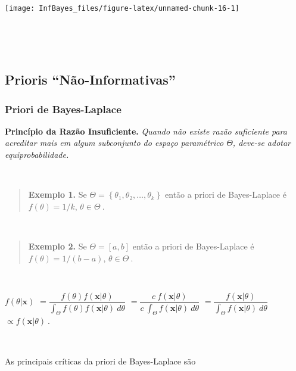 \documentclass[
]{book}
\begin{document}
\begin{center}\texttt{[image: InfBayes\_files/figure-latex/unnamed-chunk-16-1]} \end{center}

\(~\)

\(~\)

\hypertarget{prioris-nuxe3o-informativas}{%
\subsection{Prioris ``Não-Informativas''}\label{prioris-nuxe3o-informativas}}

\hypertarget{priori-de-bayes-laplace}{%
\subsubsection{Priori de Bayes-Laplace}\label{priori-de-bayes-laplace}}

\textbf{Princípio da Razão Insuficiente.} \emph{Quando não existe razão suficiente para acreditar mais em algum subconjunto do espaço paramétrico \(\Theta\), deve-se adotar equiprobabilidade.}

\(~\)

\begin{quote}
\textbf{Exemplo 1.} Se \(\Theta=\left\{\theta_1,\theta_2,\ldots,\theta_k\right\}\) então a priori de Bayes-Laplace é \(f(\theta)=1/k\), \(\theta \in \Theta~.\)
\end{quote}

\(~\)

\begin{quote}
\textbf{Exemplo 2.} Se \(\Theta=\left[a,b\right]\) então a priori de Bayes-Laplace é \(f(\theta)=1/(b-a)\), \(\theta \in \Theta~.\)
\end{quote}

\(~\)

\(f(\theta|\boldsymbol{x})\)
\(= \dfrac{f(\theta)f(\boldsymbol{x}|\theta)}{\int_\Theta f(\theta)f(\boldsymbol{x}|\theta)~d\theta}\)
\(= \dfrac{c~f(\boldsymbol{x}|\theta)}{c~\int_\Theta f(\boldsymbol{x}|\theta)~d\theta}\)
\(= \dfrac{f(\boldsymbol{x}|\theta)}{\int_\Theta f(\boldsymbol{x}|\theta)~d\theta}\)
\(\propto f(\boldsymbol{x}|\theta)~.\)

\(~\)

As principais críticas da priori de Bayes-Laplace são
\end{document}
